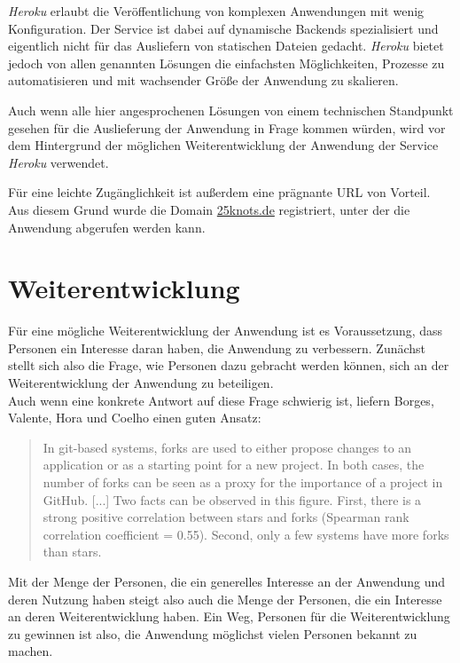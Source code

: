 \textit{Heroku} erlaubt die Veröffentlichung von komplexen Anwendungen mit wenig Konfiguration. Der Service ist dabei auf dynamische Backends spezialisiert und eigentlich nicht für das Ausliefern von statischen Dateien gedacht. \textit{Heroku} bietet jedoch von allen genannten Lösungen die einfachsten Möglichkeiten, Prozesse zu automatisieren und mit wachsender Größe der Anwendung zu skalieren.

Auch wenn alle hier angesprochenen Lösungen von einem technischen Standpunkt gesehen für die Auslieferung der Anwendung in Frage kommen würden, wird vor dem Hintergrund der möglichen Weiterentwicklung der Anwendung der Service \textit{Heroku} verwendet.

Für eine leichte Zugänglichkeit ist außerdem eine prägnante URL von Vorteil. Aus diesem Grund wurde die Domain \url{25knots.de} registriert, unter der die Anwendung abgerufen werden kann.

\section{Weiterentwicklung}
\label{chap:public}
Für eine mögliche Weiterentwicklung der Anwendung ist es Voraussetzung, dass Personen ein Interesse daran haben, die Anwendung zu verbessern. Zunächst stellt sich also die Frage, wie Personen dazu gebracht werden können, sich an der Weiterentwicklung der Anwendung zu beteiligen.\\
Auch wenn eine konkrete Antwort auf diese Frage schwierig ist, liefern Borges, Valente, Hora und Coelho einen guten Ansatz:

\begin{quote}
  In git-based systems, forks are used to either propose changes to an application or as
a starting point for a new project. In both cases, the number of forks can be seen as a proxy
for the importance of a project in GitHub. [...] Two facts can be observed in this figure. First, there is a strong positive
correlation between stars and forks (Spearman rank correlation coefficient = 0.55). Second,
only a few systems have more forks than stars. \cite{borges2015popularity}
\end{quote}

Mit der Menge der Personen, die ein generelles Interesse an der Anwendung und deren Nutzung haben steigt also auch die Menge der Personen, die ein Interesse an deren Weiterentwicklung haben. Ein Weg, Personen für die Weiterentwicklung zu gewinnen ist also, die Anwendung möglichst vielen Personen bekannt zu machen.

